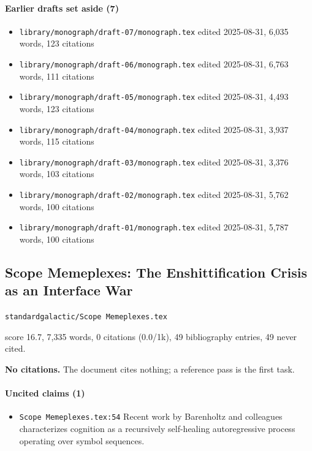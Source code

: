 \documentclass[11pt]{article}
\newcommand{\loc}[1]{{\small\color{muted}\texttt{#1}}}
\begin{document}
\paragraph{Earlier drafts set aside (7)}
\begin{itemize}
\item \loc{library/\allowbreak{}monograph/\allowbreak{}draft-07/\allowbreak{}monograph.tex} edited 2025-08-31, 6,035 words, 123 citations
\item \loc{library/\allowbreak{}monograph/\allowbreak{}draft-06/\allowbreak{}monograph.tex} edited 2025-08-31, 6,763 words, 111 citations
\item \loc{library/\allowbreak{}monograph/\allowbreak{}draft-05/\allowbreak{}monograph.tex} edited 2025-08-31, 4,493 words, 123 citations
\item \loc{library/\allowbreak{}monograph/\allowbreak{}draft-04/\allowbreak{}monograph.tex} edited 2025-08-31, 3,937 words, 115 citations
\item \loc{library/\allowbreak{}monograph/\allowbreak{}draft-03/\allowbreak{}monograph.tex} edited 2025-08-31, 3,376 words, 103 citations
\item \loc{library/\allowbreak{}monograph/\allowbreak{}draft-02/\allowbreak{}monograph.tex} edited 2025-08-31, 5,762 words, 100 citations
\item \loc{library/\allowbreak{}monograph/\allowbreak{}draft-01/\allowbreak{}monograph.tex} edited 2025-08-31, 5,787 words, 100 citations
\end{itemize}
\subsection{Scope Memeplexes: The Enshittification Crisis as an Interface War}
\loc{standardgalactic/\allowbreak{}Scope Memeplexes.tex}\par
score 16.7, 7,335 words, 0 citations (0.0/1k), 49 bibliography entries, 49 never cited.

\textbf{No citations.} The document cites nothing; a reference pass is the first task.

\paragraph{Uncited claims (1)}
\begin{itemize}
\item \loc{Scope Memeplexes.tex:54} Recent work by Barenholtz and colleagues characterizes cognition as a recursively self-healing autoregressive process operating over symbol sequences.
\end{itemize}
\end{document}
